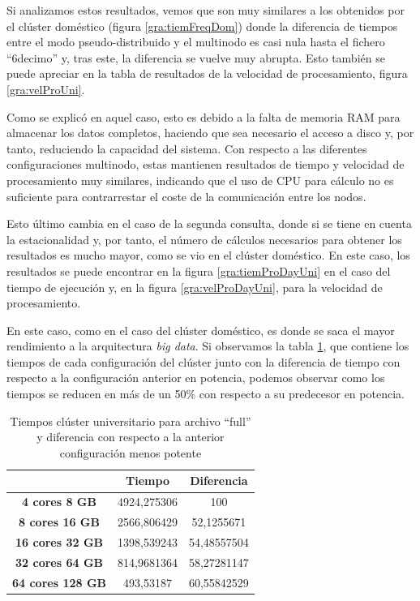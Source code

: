 Si analizamos estos resultados, vemos que son muy similares a los obtenidos por el clúster doméstico (figura \ref{gra:tiemFreqDom}) donde la diferencia de tiempos entre el modo pseudo-distribuido y el multinodo es casi nula hasta el fichero ``6decimo'' y, tras este, la diferencia se vuelve muy abrupta. Esto también se puede apreciar en la tabla de resultados de la velocidad de procesamiento, figura \ref{gra:velProUni}.

Como se explicó en aquel caso, esto es debido a la falta de memoria \gls{RAM} para almacenar los datos completos, haciendo que sea necesario el acceso a disco y, por tanto, reduciendo la capacidad del sistema. Con respecto a las diferentes configuraciones multinodo, estas mantienen resultados de tiempo y velocidad de procesamiento muy similares, indicando que el uso de \gls{CPU} para cálculo no es suficiente para contrarrestar el coste de la comunicación entre los nodos.

Esto último cambia en el caso de la segunda consulta, donde si se tiene en cuenta la estacionalidad y, por tanto, el número de cálculos necesarios para obtener los resultados es mucho mayor, como se vio en el clúster doméstico. En este caso, los resultados se puede encontrar en la figura \ref{gra:tiemProDayUni} en el caso del tiempo de ejecución y, en la figura \ref{gra:velProDayUni}, para la velocidad de procesamiento.

En este caso, como en el caso del clúster doméstico, es donde se saca el mayor rendimiento a la arquitectura \textit{big data}. Si observamos la tabla \ref{t:tiemfull}, que contiene los tiempos de cada configuración del clúster junto con la diferencia de tiempo con respecto a la configuración anterior en potencia, podemos observar como los tiempos se reducen en más de un 50\% con respecto a su predecesor en potencia.

\begin{table}[htp!]
	\centering
	\caption{Tiempos clúster universitario para archivo ``full'' y diferencia con respecto a la anterior configuración menos potente}
	\label{t:tiemfull}
	\begin{tabular}{|c|c|c|}
		\hline
		\multicolumn{1}{|l|}{}   & \textbf{Tiempo} & \textbf{Diferencia} \\ \hline
		\textbf{4 cores 8 GB}    & 4924,275306     & 100                 \\ \hline
		\textbf{8 cores 16 GB}   & 2566,806429     & 52,1255671          \\ \hline
		\textbf{16 cores 32 GB}  & 1398,539243     & 54,48557504         \\ \hline
		\textbf{32 cores 64 GB}  & 814,9681364     & 58,27281147         \\ \hline
		\textbf{64 cores 128 GB} & 493,53187       & 60,55842529         \\ \hline
	\end{tabular}
\end{table}

